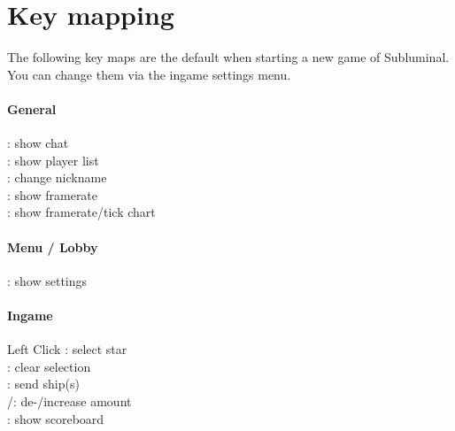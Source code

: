 \chapter{Key mapping}
The following key maps are the default when starting a new game of Subluminal. You can change them via the ingame settings menu.

\begin{multicols*}{3}
  \subsubsection{General}
  \noindent{} : show chat \\[0.5em]
   : show player list \\[0.5em]
   : change nickname \\[0.5em]
   : show framerate \\[0.5em]
   : show framerate/tick chart \\[0.5em]
  
  \subsubsection{Menu / Lobby}
  \noindent\Esc : show settings\\[0.5em]

  \subsubsection{Ingame}
  Left Click : select star \\[0.5em]
  \Esc : clear selection\\[0.5em]
  \Return : send ship(s) \\[0.5em]
  \LArrow/\RArrow : de-/increase amount \\[0.5em]
  \Tab : show scoreboard \\[0.5em]
\end{multicols*}
